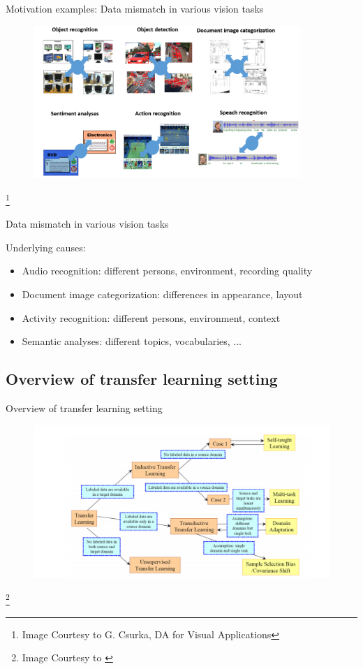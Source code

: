 \documentclass{beamer}
\begin{document}
\begin{frame}{Motivation examples: Data mismatch in various vision tasks}
\begin{figure}
\includegraphics[width=0.9\textwidth]{figs/m2.png}
\end{figure}
\footnote{Image Courtesy to G. Csurka, DA for Visual Applications}
\end{frame}
\begin{frame}{ Data mismatch in various vision tasks}
\begin{block}{Underlying causes: }
\begin{itemize}
\item Audio recognition: different persons, environment, recording quality
\item Document image categorization: differences in appearance, layout
\item Activity recognition: different persons, environment, context
\item  Semantic analyses: different topics, vocabularies, ...
\end{itemize}
\end{block}
\end{frame}

\subsection{Overview of transfer learning setting}
\begin{frame}{Overview of transfer learning setting}
\begin{figure}
\includegraphics[width=\textwidth]{figs/f2.png}
\end{figure}
\footnote{Image Courtesy to \textcite{2010survey}}
\end{frame}
\end{document}
